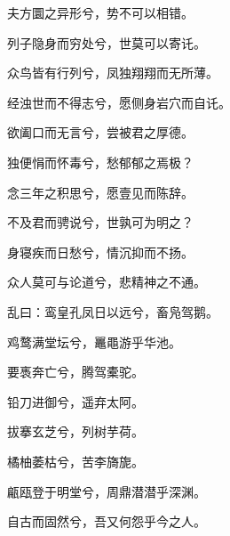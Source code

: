 \documentclass[12pt,a4paper]{ctexbook}
\begin{document}
夫方圜之异形兮，势不可以相错。\par
列子隐身而穷处兮，世莫可以寄讬。\par
众鸟皆有行列兮，凤独翔翔而无所薄。\par
经浊世而不得志兮，愿侧身岩穴而自讬。\par
欲阖口而无言兮，尝被君之厚德。\par
独便悁而怀毒兮，愁郁郁之焉极？\par
念三年之积思兮，愿壹见而陈辞。\par
不及君而骋说兮，世孰可为明之？\par
身寝疾而日愁兮，情沉抑而不扬。\par
众人莫可与论道兮，悲精神之不通。\par
乱曰：鸾皇孔凤日以远兮，畜凫驾鹅。\par
鸡鹜满堂坛兮，鼉黽游乎华池。\par
要褭奔亡兮，腾驾橐驼。\par
铅刀进御兮，遥弃太阿。\par
拔搴玄芝兮，列树芋荷。\par
橘柚萎枯兮，苦李旖旎。\par
甂瓯登于明堂兮，周鼎潜潜乎深渊。\par
自古而固然兮，吾又何怨乎今之人。\par
\end{document}
